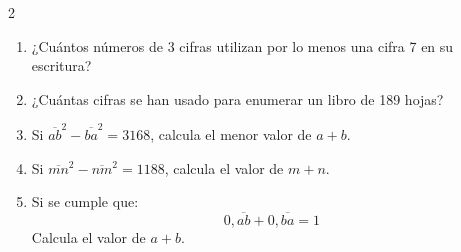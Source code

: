 \documentclass[10pt]{article}
\begin{document}
\begin{multicols}{2}
\begin{enumerate}[label=\textbf{\arabic*.}, itemsep=0.5cm]
    \item ¿Cuántos números de 3 cifras utilizan por lo menos una cifra 7 en su escritura?

    \item ¿Cuántas cifras se han usado para enumerar un libro de 189 hojas?

    \item Si $\overline{ab}^2 - \overline{ba}^2 = 3168$, calcula el menor valor de $a + b$.


    \item Si $\overline{mn}^2 - \overline{nm}^2 = 1188$, calcula el valor de $m + n$.

    \item Si se cumple que:
    \[
        0{,}\overline{ab} + 0{,}\overline{ba} = 1
    \]
    Calcula el valor de $a + b$.

\end{enumerate}
\end{multicols}
\end{document}
